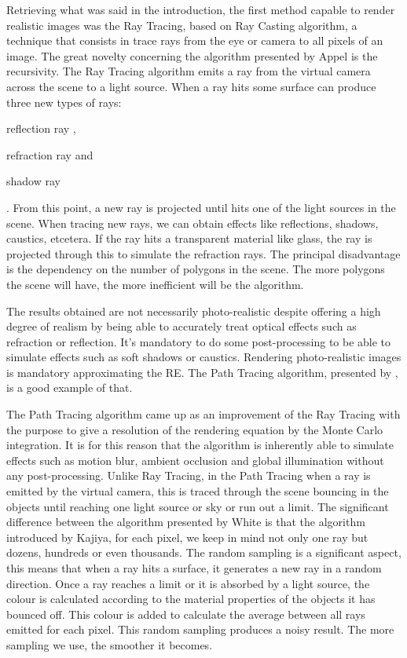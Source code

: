 \documentclass[titlepage,12pt]{article}
\begin{document}
Retrieving what was said in the introduction, the first method capable to render realistic images was the Ray Tracing, based on Ray Casting algorithm, a technique that consists in trace rays from the eye or camera to all pixels of an image. The great novelty concerning the algorithm presented by Appel is the recursivity. The Ray Tracing algorithm emits a ray from the virtual camera across the scene to a light source. When a ray hits some surface can produce three new types of rays: \begin{enumerate*}[label=\roman*)] \item
 reflection ray \label{ray:reflected}, \item
 refraction ray and \item
 shadow ray\end{enumerate*}. From this point, a new ray is projected until hits one of the light sources in the scene. When tracing new rays, we can obtain effects like reflections, shadows, caustics, etcetera. If the ray hits a transparent material like glass, the ray is projected through this to simulate the refraction rays. The principal disadvantage is the dependency on the number of polygons in the scene. The more polygons the scene will have, the more inefficient will be the algorithm.

The results obtained are not necessarily photo-realistic despite offering a high degree of realism by being able to accurately treat optical effects such as refraction or reflection. It's mandatory to do some post-processing to be able to simulate effects such as soft shadows or caustics. Rendering photo-realistic images is mandatory approximating the RE. The Path Tracing algorithm, presented by \citep{Kajiya1986}, is a good example of that.

The Path Tracing algorithm came up as an improvement of the Ray Tracing with the purpose to give a resolution of the rendering equation by the Monte Carlo integration. It is for this reason that the algorithm is inherently able to simulate effects such as motion blur, ambient occlusion and global illumination without any post-processing. Unlike Ray Tracing, in the Path Tracing when a ray is emitted by the virtual camera, this is traced through the scene bouncing in the objects until reaching one light source or sky or run out a limit. The significant difference between the algorithm presented by White is that the algorithm introduced by Kajiya, for each pixel, we keep in mind not only one ray but dozens, hundreds or even thousands. The random sampling is a significant aspect, this means that when a  ray hits a surface, it generates a new ray in a random direction. Once a ray reaches a limit or it is absorbed by a light source, the colour is calculated according to the material properties of the objects it has bounced off. This colour is added to calculate the average between all rays emitted for each pixel. This random sampling produces a noisy result. The more sampling we use, the smoother it becomes.
\end{document}
